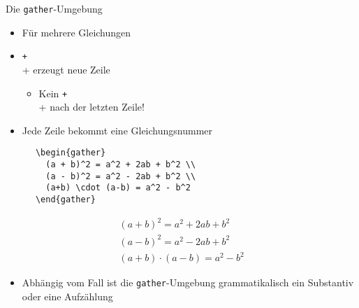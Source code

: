 \begin{frame}[fragile]{Die \texttt{gather}-Umgebung}
  \begin{itemize}
    \item Für mehrere Gleichungen
    \item \texttt+\\+ erzeugt neue Zeile
      \begin{itemize}
        \item Kein \texttt+\\+ nach der letzten Zeile!
      \end{itemize}
    \item Jede Zeile bekommt eine Gleichungsnummer
  \end{itemize}
  \begin{CodeExample}{0.54}
    \begin{verbatim}
      \begin{gather}
        (a + b)^2 = a^2 + 2ab + b^2 \\
        (a - b)^2 = a^2 - 2ab + b^2 \\
        (a+b) \cdot (a-b) = a^2 - b^2
      \end{gather}
    \end{verbatim}
  \CodeResult
    \begin{minipage}[c][5\baselineskip][c]{\textwidth}
      \begin{gather}
        (a + b)^2 = a^2 + 2ab + b^2 \\
        (a - b)^2 = a^2 - 2ab + b^2 \\
        (a + b) \cdot (a - b) = a^2 - b^2
      \end{gather}
    \end{minipage}
  \end{CodeExample}

  \vspace{1em}
  \begin{itemize}
    \item Abhängig vom Fall ist die \texttt{gather}-Umgebung grammatikalisch ein Substantiv oder eine Aufzählung
  \end{itemize}
\end{frame}

